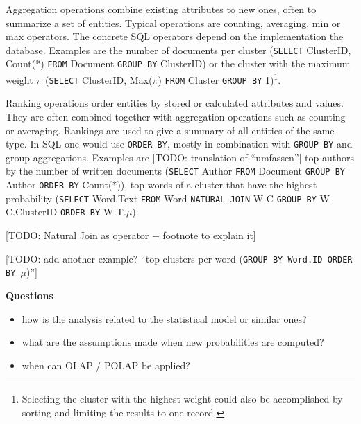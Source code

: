 Aggregation operations combine existing attributes to new ones, often to summarize a set of entities. Typical operations are counting, averaging, min or max operators. The concrete SQL operators depend on the implementation the database. Examples are the number of documents per cluster (\texttt{SELECT} ClusterID, Count(*) \texttt{FROM} Document \texttt{GROUP BY} ClusterID) or the cluster with the maximum weight $\pi$ (\texttt{SELECT} ClusterID, Max($\pi$) \texttt{FROM} Cluster \texttt{GROUP BY} 1)\footnote{Selecting the cluster with the highest weight could also be accomplished by sorting and limiting the results to one record.}.

Ranking operations order entities by stored or calculated attributes and values. They are often combined together with aggregation operations such as counting or averaging. Rankings are used to give a summary of all entities of the same type. In SQL one would use \texttt{ORDER BY}, mostly in combination with \texttt{GROUP BY} and group aggregations. Examples are [TODO: translation of ``umfassen''] top authors by the number of written documents (\texttt{SELECT} Author \texttt{FROM} Document \texttt{GROUP BY} Author \texttt{ORDER BY} Count(*)), top words of a cluster that have the highest probability (\texttt{SELECT} Word.Text \texttt{FROM} Word \texttt{NATURAL JOIN} W-C \texttt{GROUP BY} W-C.ClusterID \texttt{ORDER BY} W-T.$\mu$).

[TODO: Natural Join as operator + footnote to explain it]

[TODO: add another example? ``top clusters per word (\texttt{GROUP BY \textrm{Word.ID} ORDER BY $\mu$})'']

\textbf{Questions}
\begin{itemize}
\item how is the analysis related to the statistical model or similar ones?
\item what are the assumptions made when new probabilities are computed?
\item when can OLAP / POLAP be applied?
\end{itemize}
